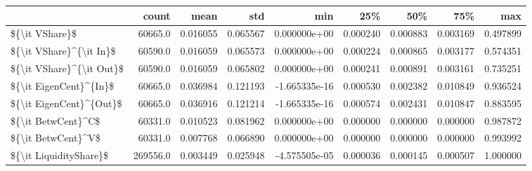 \begin{tabular}{lrrrrrrrr}
\toprule
{} &     count &      mean &       std &           min &       25\% &       50\% &       75\% &       max \\
\midrule
\$\{\textbackslash it VShare\}\$           &   60665.0 &  0.016055 &  0.065567 &  0.000000e+00 &  0.000240 &  0.000883 &  0.003169 &  0.497899 \\
\$\{\textbackslash it VShare\}\textasciicircum \{\textbackslash it In\}\$  &   60590.0 &  0.016059 &  0.065573 &  0.000000e+00 &  0.000224 &  0.000865 &  0.003177 &  0.574351 \\
\$\{\textbackslash it VShare\}\textasciicircum \{\textbackslash it Out\}\$ &   60590.0 &  0.016059 &  0.065802 &  0.000000e+00 &  0.000241 &  0.000891 &  0.003161 &  0.735251 \\
\$\{\textbackslash it EigenCent\}\textasciicircum \{In\}\$   &   60665.0 &  0.036984 &  0.121193 & -1.665335e-16 &  0.000530 &  0.002382 &  0.010849 &  0.936524 \\
\$\{\textbackslash it EigenCent\}\textasciicircum \{Out\}\$  &   60665.0 &  0.036916 &  0.121214 & -1.665335e-16 &  0.000574 &  0.002431 &  0.010847 &  0.883595 \\
\$\{\textbackslash it BetwCent\}\textasciicircum C\$       &   60331.0 &  0.010523 &  0.081962 &  0.000000e+00 &  0.000000 &  0.000000 &  0.000000 &  0.987872 \\
\$\{\textbackslash it BetwCent\}\textasciicircum V\$       &   60331.0 &  0.007768 &  0.066890 &  0.000000e+00 &  0.000000 &  0.000000 &  0.000000 &  0.993992 \\
\$\{\textbackslash it LiquidityShare\}\$   &  269556.0 &  0.003449 &  0.025948 & -4.575505e-05 &  0.000036 &  0.000145 &  0.000507 &  1.000000 \\
\bottomrule
\end{tabular}
